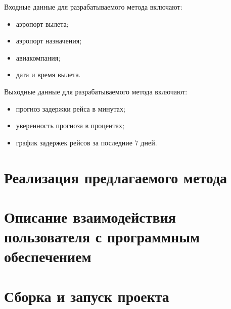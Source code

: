 Входные данные для разрабатываемого метода включают:
\begin{itemize}[label=---]
    \item аэропорт вылета;
    \item аэропорт назначения;
    \item авиакомпания;
    \item дата и время вылета.
\end{itemize}

Выходные данные для разрабатываемого метода включают:
\begin{itemize}[label=---]
    \item прогноз задержки рейса в минутах;
    \item уверенность прогноза в процентах;
    \item график задержек рейсов за последние 7 дней.
\end{itemize}

\section{Реализация предлагаемого метода}
\section{Описание взаимодействия пользователя с программным обеспечением}
\section{Сборка и запуск проекта}
